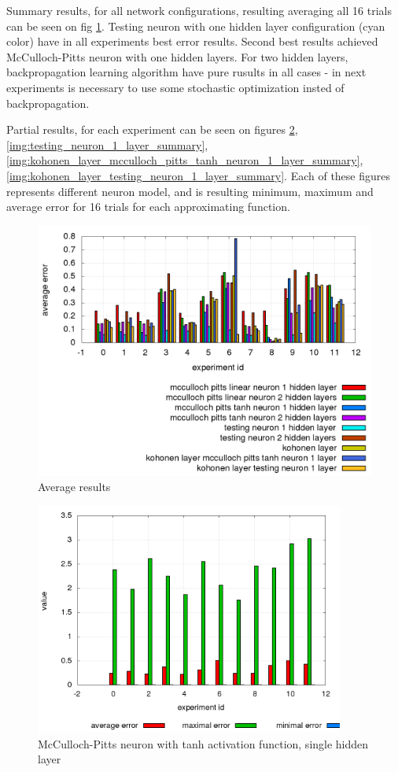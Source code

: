 \documentclass[10pt,a5paper]{article}
\begin{document}
Summary results, for all network configurations, resulting averaging all 16 trials
can be seen on fig \ref{img:NN Average results}. Testing neuron with one hidden layer
configuration (cyan color) have in all experiments best error results. Second best
results achieved McCulloch-Pitts neuron with one hidden layers. For two hidden layers,
backpropagation learning algorithm have pure rusults in all cases - in next experiments is
necessary to use some stochastic optimization insted of backpropagation.

Partial results, for each experiment can be seen on figures \ref{img:mcculloch_pitts_tanh_neuron},
\ref{img:testing_neuron_1_layer_summary}, \ref{img:kohonen_layer_mcculloch_pitts_tanh_neuron_1_layer_summary},
\ref{img:kohonen_layer_testing_neuron_1_layer_summary}. Each of these figures represents different neuron
model, and is resulting minimum, maximum and average error for 16 trials for each approximating function.


\begin{figure}[!ht]
\centering
\includegraphics[width=4.5in]{images/summary_result_all_average_error_log.png}
\caption{Average results}
\label{img:NN Average results}
\end{figure}


\begin{figure}[!ht]
\centering
\includegraphics[width=4.0in]{images/mcculloch_pitts_tanh_neuron_1_layer_summary_result_log.png}
\caption{McCulloch-Pitts neuron with tanh activation function, single hidden layer}
\label{img:mcculloch_pitts_tanh_neuron}
\end{figure}
\end{document}
